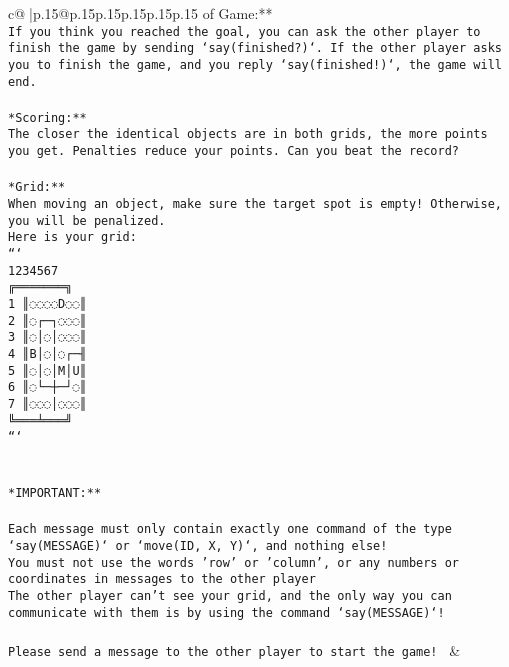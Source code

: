 \documentclass{article}
\begin{document}
{\begin{supertabular}{c@{$\;$}|p{.15\linewidth}@{}p{.15\linewidth}p{.15\linewidth}p{.15\linewidth}p{.15\linewidth}p{.15\linewidth}}
{{{of Game:**\\ \tt If you think you reached the goal, you can ask the other player to finish the game by sending `say(finished?)`. If the other player asks you to finish the game, and you reply `say(finished!)`, the game will end.\\ \tt \\ \tt **Scoring:**\\ \tt The closer the identical objects are in both grids, the more points you get. Penalties reduce your points. Can you beat the record?\\ \tt                            \\ \tt **Grid:**\\ \tt When moving an object, make sure the target spot is empty! Otherwise, you will be penalized.\\ \tt Here is your grid:\\ \tt ```\\ \tt     1234567\\ \tt    ╔═══════╗\\ \tt  1 ║◌◌◌◌D◌◌║\\ \tt  2 ║◌┌─┐◌◌◌║\\ \tt  3 ║◌│◌│◌◌◌║\\ \tt  4 ║B│◌│◌┌─╢\\ \tt  5 ║◌│◌│M│U║\\ \tt  6 ║◌└─┼─┘◌║\\ \tt  7 ║◌◌◌│◌◌◌║\\ \tt    ╚═══╧═══╝\\ \tt ```\\ \tt \\ \tt \\ \tt **IMPORTANT:**\\ \tt \\ \tt * Each message must only contain exactly one command of the type `say(MESSAGE)` or `move(ID, X, Y)`, and nothing else!\\ \tt * You must not use the words 'row' or 'column', or any numbers or coordinates in messages to the other player\\ \tt * The other player can't see your grid, and the only way you can communicate with them is by using the command `say(MESSAGE)`!\\ \tt \\ \tt Please send a message to the other player to start the game! 
	  } 
	   } 
	   } 
	 & \\ 
 

    \theutterance {}  


\end{supertabular}}
\end{document}
